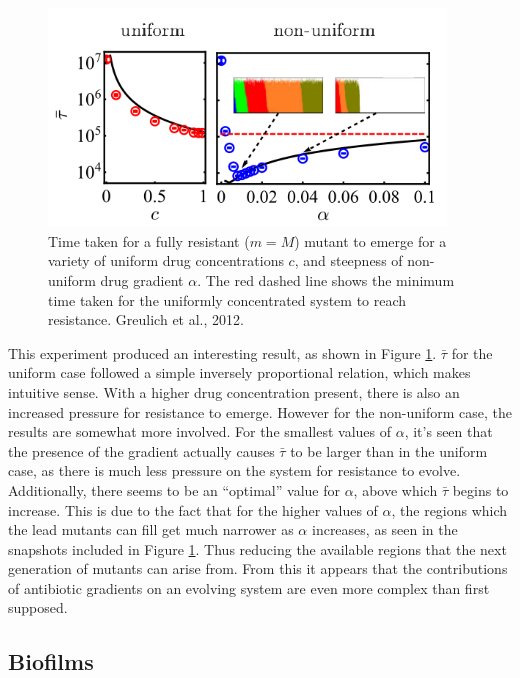 \documentclass[a4paper,12pt]{article}
\begin{document}
\begin{figure}[H]
 \centering
 \includegraphics[height=5.8cm]{greulich-time-til-resistance}
 \caption{Time taken for a fully resistant ($m = M$) mutant to emerge for a variety of uniform drug concentrations $c$, and steepness of non-uniform drug gradient $\alpha$.  
 The red dashed line shows the minimum time taken for the uniformly concentrated system to reach resistance.  Greulich et al., 2012.}
 \label{fig:Greulich-time-til-resistance}
\end{figure}


This experiment produced an interesting result, as shown in Figure \ref{fig:Greulich-time-til-resistance}.  $\bar{\tau}$ for the uniform case followed a simple inversely 
proportional relation, which makes intuitive sense.  With a higher drug concentration present, there is also an increased pressure for resistance to emerge.  However 
for the non-uniform case, the results are somewhat more involved.  For the smallest values of $\alpha$, it's seen that the presence of the gradient actually causes $\bar{\tau}$ 
to be larger than in the uniform case, as there is much less pressure on the system for resistance to evolve.  Additionally, there seems to be an ``optimal'' value for $\alpha$, 
above which $\bar{\tau}$ begins to increase.  This is due to the fact that for the higher values of $\alpha$, the regions which the lead mutants can fill get much narrower as 
$\alpha$ increases, as seen in the snapshots included in Figure \ref{fig:Greulich-time-til-resistance}.  Thus reducing the available regions that the next generation of mutants 
can arise from.  From this it appears that the contributions of antibiotic gradients on an evolving system are even more complex than first supposed.



\subsection{Biofilms}
\end{document}
